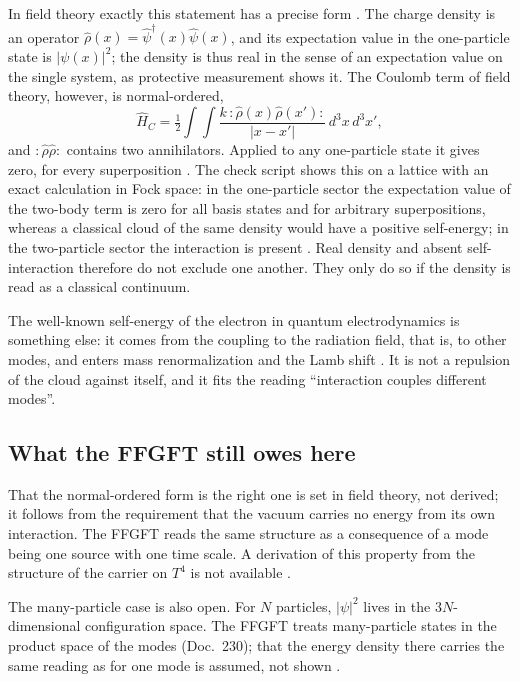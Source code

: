 In field theory exactly this statement has a precise form \EM. The charge density is an operator
$\hat\rho(x)=\hat\psi^\dagger(x)\hat\psi(x)$, and its expectation value in the one-particle state is
$|\psi(x)|^2$; the density is thus real in the sense of an expectation value on the single system,
as protective measurement shows it. The Coulomb term of field theory, however, is normal-ordered,
\begin{equation}
  \hat H_C=\tfrac12\!\int\!\!\int \frac{k\,{:}\hat\rho(x)\hat\rho(x'){:}}{|x-x'|}\,d^3x\,d^3x' ,
\end{equation}
and ${:}\hat\rho\hat\rho{:}$ contains two annihilators. Applied to any one-particle state it gives
zero, for every superposition \BM. The check script shows this on a lattice with an exact calculation
in Fock space: in the one-particle sector the expectation value of the two-body term is zero for all
basis states and for arbitrary superpositions, whereas a classical cloud of the same density would
have a positive self-energy; in the two-particle sector the interaction is present \KM. Real density
and absent self-interaction therefore do not exclude one another. They only do so if the density is
read as a classical continuum.

The well-known self-energy of the electron in quantum electrodynamics is something else: it comes
from the coupling to the radiation field, that is, to other modes, and enters mass renormalization
and the Lamb shift \EM. It is not a repulsion of the cloud against itself, and it fits the reading
\enquote{interaction couples different modes}.

\subsection{What the FFGFT still owes here}

That the normal-ordered form is the right one is set in field theory, not derived; it follows from
the requirement that the vacuum carries no energy from its own interaction. The FFGFT reads the same
structure as a consequence of a mode being one source with one time scale. A derivation of this
property from the structure of the carrier on $T^4$ is not available \SM.

The many-particle case is also open. For $N$ particles, $|\psi|^2$ lives in the $3N$-dimensional
configuration space. The FFGFT treats many-particle states in the product space of the modes
(Doc.~230); that the energy density there carries the same reading as for one mode is assumed, not
shown \SM.

